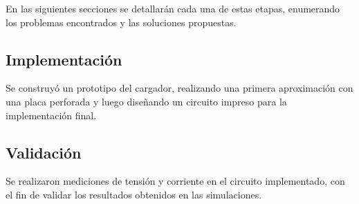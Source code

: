 En las siguientes secciones se detallarán cada una de estas etapas,
enumerando los problemas encontrados y las soluciones propuestas.

\subsection{Implementación}
Se construyó un prototipo del cargador, realizando una primera aproximación con una placa perforada
y luego diseñando un circuito impreso para la implementación final.

\subsection{Validación}
Se realizaron mediciones de tensión y corriente en el circuito implementado,
con el fin de validar los resultados obtenidos en las simulaciones.
